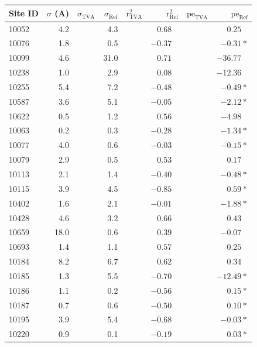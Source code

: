 \begin{tabular}{l r r r r r r r}
Site ID & $\sigma$ (A) & $\sigma_\text{TVA}$ & $\sigma_\text{Ref}$ & $\text{r}^2_\text{TVA}$ & $\text{r}^2_\text{Ref}$ & $\text{pe}_\text{TVA}$ & $\text{pe}_\text{Ref}$ \\
\hline
10052 & 4.2 &  & 4.3 &  & $0.68\phantom{*}$ &  & $0.25\phantom{*}$ \\
10076 & 1.8 &  & 0.5 &  & $-0.37\phantom{*}$ &  & $-0.31*$ \\
10099 & 4.6 &  & 31.0 &  & $0.71\phantom{*}$ &  & $-36.77\phantom{*}$ \\
10238 & 1.0 &  & 2.9 &  & $0.08\phantom{*}$ &  & $-12.36\phantom{*}$ \\
10255 & 5.4 &  & 7.2 &  & $-0.48\phantom{*}$ &  & $-0.49*$ \\
10587 & 3.6 &  & 5.1 &  & $-0.05\phantom{*}$ &  & $-2.12*$ \\
10622 & 0.5 &  & 1.2 &  & $0.56\phantom{*}$ &  & $-4.98\phantom{*}$ \\
10063 & 0.2 &  & 0.3 &  & $-0.28\phantom{*}$ &  & $-1.34*$ \\
10077 & 4.0 &  & 0.6 &  & $-0.03\phantom{*}$ &  & $-0.15*$ \\
10079 & 2.9 &  & 0.5 &  & $0.53\phantom{*}$ &  & $0.17\phantom{*}$ \\
10113 & 2.1 &  & 1.4 &  & $-0.40\phantom{*}$ &  & $-0.48*$ \\
10115 & 3.9 &  & 4.5 &  & $-0.85\phantom{*}$ &  & $0.59*$ \\
10402 & 1.6 &  & 2.1 &  & $-0.01\phantom{*}$ &  & $-1.88*$ \\
10428 & 4.6 &  & 3.2 &  & $0.66\phantom{*}$ &  & $0.43\phantom{*}$ \\
10659 & 18.0 &  & 0.6 &  & $0.39\phantom{*}$ &  & $-0.07\phantom{*}$ \\
10693 & 1.4 &  & 1.1 &  & $0.57\phantom{*}$ &  & $0.25\phantom{*}$ \\
10184 & 8.2 &  & 6.7 &  & $0.62\phantom{*}$ &  & $0.34\phantom{*}$ \\
10185 & 1.3 &  & 5.5 &  & $-0.70\phantom{*}$ &  & $-12.49*$ \\
10186 & 1.1 &  & 0.2 &  & $-0.56\phantom{*}$ &  & $0.15*$ \\
10187 & 0.7 &  & 0.6 &  & $-0.50\phantom{*}$ &  & $0.10*$ \\
10195 & 3.9 &  & 5.4 &  & $-0.68\phantom{*}$ &  & $-0.03*$ \\
10220 & 0.9 &  & 0.1 &  & $-0.19\phantom{*}$ &  & $0.03*$ \\

\end{tabular}

